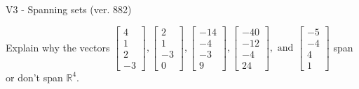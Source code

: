\begin{exercise}
  \begin{exerciseTitle}V3 - Spanning sets (ver. 882)\end{exerciseTitle}
  \begin{exerciseStatement}
    Explain why the vectors \(\left[\begin{array}{r}
4 \\
1 \\
2 \\
-3
\end{array}\right] , \left[\begin{array}{r}
2 \\
1 \\
-3 \\
0
\end{array}\right] , \left[\begin{array}{r}
-14 \\
-4 \\
-3 \\
9
\end{array}\right] , \left[\begin{array}{r}
-40 \\
-12 \\
-4 \\
24
\end{array}\right] , \text{ and } \left[\begin{array}{r}
-5 \\
-4 \\
4 \\
1
\end{array}\right]\) span or don't span \(\mathbb{R}^4\). 
	



\end{exerciseStatement}
\end{exercise}
